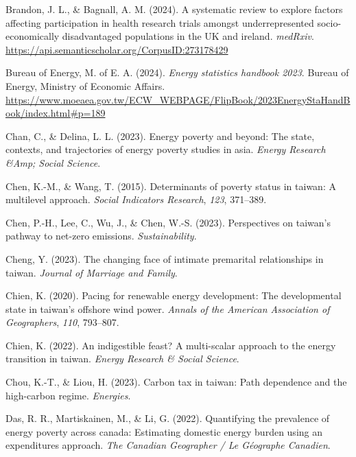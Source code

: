\documentclass[
  twoside,
  openright,
  degree    = master,               %
  language  = english,              %
  fontset   = overleaf,             %
  watermark = true,                 %
  doi       = true,                 %
]{ntuthesis}
\newlength{\cslhangindent}
\newlength{\cslentryspacingunit} %
\newenvironment{CSLReferences}[2] %
 {%
  \setlength{\parindent}{0pt}
  \ifodd #1
  \let\oldpar\par
  \def\par{\hangindent=\cslhangindent\oldpar}
  \fi
  \setlength{\parskip}{#2\cslentryspacingunit}
 }%
 {}
\begin{document}
\begin{CSLReferences}{1}{0}
\leavevmode{}%
Brandon, J. L., \& Bagnall, A. M. (2024). A systematic review to explore
factors affecting participation in health research trials amongst
underrepresented socio-economically disadvantaged populations in the UK
and ireland. \emph{medRxiv}.
\url{https://api.semanticscholar.org/CorpusID:273178429}

\leavevmode{}%
Bureau of Energy, M. of E. A. (2024). \emph{Energy statistics handbook
2023}. Bureau of Energy, Ministry of Economic Affairs.
\url{https://www.moeaea.gov.tw/ECW_WEBPAGE/FlipBook/2023EnergyStaHandBook/index.html\#p=189}

\leavevmode{}%
Chan, C., \& Delina, L. L. (2023). Energy poverty and beyond: The state,
contexts, and trajectories of energy poverty studies in asia.
\emph{Energy Research \&Amp; Social Science}.

\leavevmode{}%
Chen, K.-M., \& Wang, T. (2015). Determinants of poverty status in
taiwan: A multilevel approach. \emph{Social Indicators Research},
\emph{123}, 371--389.

\leavevmode{}%
Chen, P.-H., Lee, C., Wu, J., \& Chen, W.-S. (2023). Perspectives on
taiwan's pathway to net-zero emissions. \emph{Sustainability}.

\leavevmode{}%
Cheng, Y. (2023). The changing face of intimate premarital relationships
in taiwan. \emph{Journal of Marriage and Family}.

\leavevmode{}%
Chien, K. (2020). Pacing for renewable energy development: The
developmental state in taiwan's offshore wind power. \emph{Annals of the
American Association of Geographers}, \emph{110}, 793--807.

\leavevmode{}%
Chien, K. (2022). An indigestible feast? A multi-scalar approach to the
energy transition in taiwan. \emph{Energy Research \& Social Science}.

\leavevmode{}%
Chou, K.-T., \& Liou, H. (2023). Carbon tax in taiwan: Path dependence
and the high-carbon regime. \emph{Energies}.

\leavevmode{}%
Das, R. R., Martiskainen, M., \& Li, G. (2022). Quantifying the
prevalence of energy poverty across canada: Estimating domestic energy
burden using an expenditures approach. \emph{The Canadian Geographer /
Le Géographe Canadien}.


\end{CSLReferences}
\end{document}
